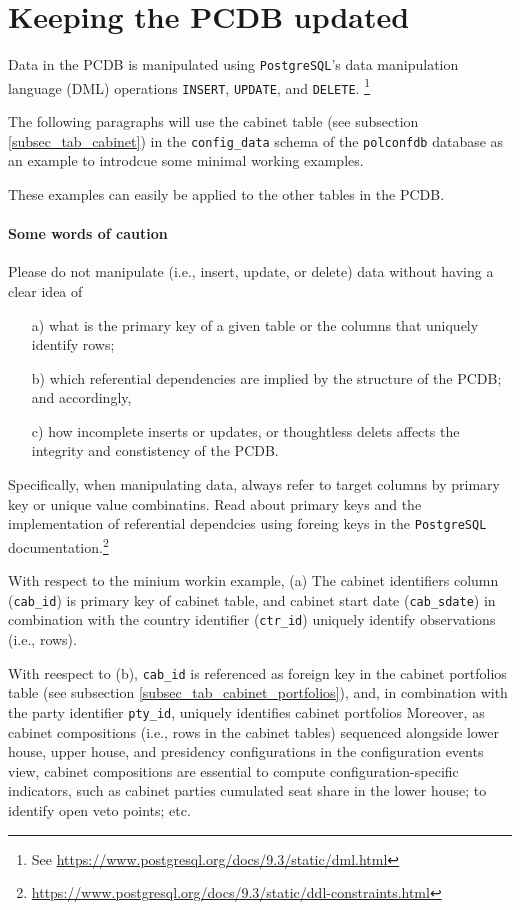 \section{Keeping the PCDB updated}\label{sec_keeping_the_PCDB_updated}

Data in the PCDB is manipulated using \texttt{PostgreSQL}'s data manipulation language (DML) operations \texttt{INSERT}, \texttt{UPDATE}, and \texttt{DELETE}. \footnote{See \url{https://www.postgresql.org/docs/9.3/static/dml.html}}

The following paragraphs will use the cabinet table (see subsection \ref{subsec_tab_cabinet}) in the \texttt{config\_data} schema of the \texttt{polconfdb} database as an example to introdcue some minimal working examples.

These examples can easily be applied to the other tables in the PCDB. 

\paragraph{Some words of caution} 

Please do not manipulate (i.e., insert, update, or delete) data without having a clear idea of 
\begin{itemize}
\item[a)]what is the primary key of a given table or the columns that uniquely identify rows;
\item[b)]which referential dependencies are implied by the structure of the PCDB; and accordingly,
\item[c)]how incomplete inserts or updates, or thoughtless delets affects the integrity and constistency of the PCDB.
\end{itemize}
Specifically, when manipulating data, always refer to target columns by primary key or unique value combinatins.
Read about primary keys and the implementation of referential dependcies using foreing keys in the \texttt{PostgreSQL} documentation.\footnote{\url{https://www.postgresql.org/docs/9.3/static/ddl-constraints.html}}

With respect to the minium workin example, 
(a) The cabinet identifiers column (\texttt{cab\_id}) is primary key of cabinet table, and cabinet start date (\texttt{cab\_sdate}) in combination with the country identifier (\texttt{ctr\_id}) uniquely identify observations (i.e., rows). 

With reespect to (b), \texttt{cab\_id} is referenced as foreign key in the cabinet portfolios table (see subsection \ref{subsec_tab_cabinet_portfolios}), and, in combination with the party identifier \texttt{pty\_id}, uniquely identifies cabinet portfolios
Moreover, as cabinet compositions (i.e., rows in the cabinet tables) sequenced alongside lower house, upper house, and presidency configurations in the configuration events view, cabinet compositions are essential to compute configuration-specific indicators, such as cabinet parties cumulated seat share in the lower house; to identify open veto points; etc.

